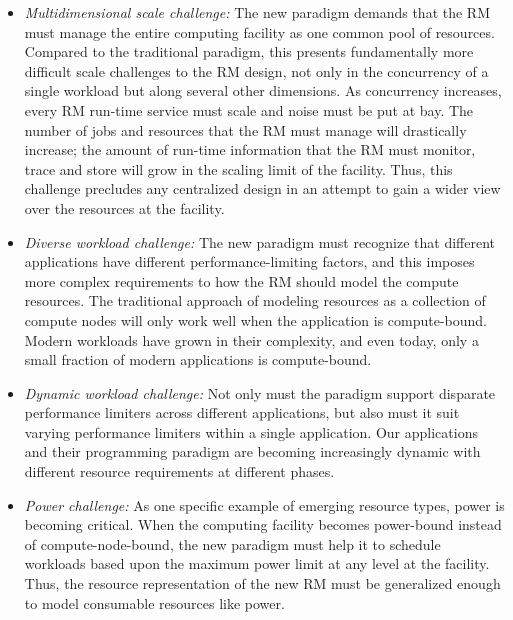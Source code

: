 \documentclass[10pt]{article}
\begin{document}
\begin{itemize}
\item{\sl Multidimensional scale challenge:} The new paradigm demands that 
      the RM must manage the entire computing facility as one common pool of 
      resources. Compared to the traditional paradigm, this presents 
      fundamentally more difficult scale challenges to the RM design,
      not only in the concurrency of a single workload but along
      several other dimensions. As concurrency increases, every RM run-time
      service must scale and noise must be put at bay.  
      The number of jobs and resources 
      that the RM must manage will drastically increase; the amount 
      of run-time information that the RM must monitor, trace and store 
      will grow in the scaling limit of the facility.
      Thus, this challenge precludes any centralized design in an attempt to 
      gain a wider view over the resources at the facility. 

\item{\sl Diverse workload challenge:} The new paradigm must recognize that
      different applications have different performance-limiting factors,
      and this imposes more complex requirements to how the RM should
      model the compute resources. The traditional approach of modeling 
      resources as a collection of compute nodes will only work well when the
      application is compute-bound. Modern workloads have grown in their
      complexity, and even today, only a small fraction of modern applications
      is compute-bound.
       
\item{\sl Dynamic workload challenge:} Not only must the paradigm support 
      disparate performance limiters across different applications, but
      also must it suit varying performance limiters within 
      a single application. Our applications and their programming paradigm
      are becoming increasingly dynamic with different resource requirements
      at different phases.

\item{\sl Power challenge:} As one specific example of emerging resource types,
      power is becoming critical. When the computing
      facility becomes power-bound instead of compute-node-bound, the new
      paradigm must help it to schedule workloads based upon the 
      maximum power limit at any level at the facility. Thus, 
      the resource representation of the new RM must be generalized
      enough to model consumable resources like power.  
      

\end{itemize}
\end{document}
